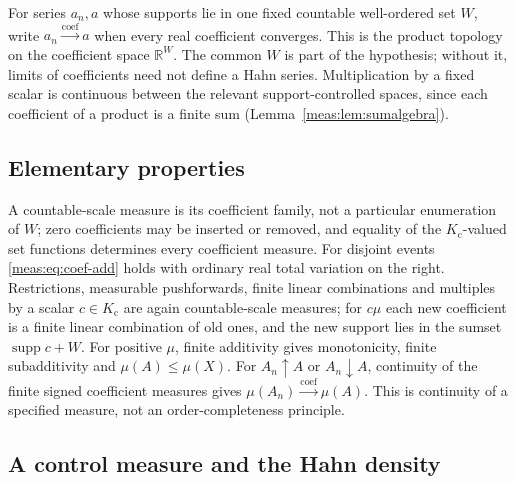 \documentclass[11pt]{article}
\numberwithin{equation}{section}
\theoremstyle{definition}
\theoremstyle{remark}
\newcommand{\R}{\mathbb R}
\newcommand{\supp}{\operatorname{supp}}
\newcommand{\Kc}{K_{\mathrm c}}
\newcommand{\tocoef}{\xrightarrow{\mathrm{coef}}}
\begin{document}
For series $a_n,a$ whose supports lie in one fixed countable well-ordered set
$W$, write $a_n\tocoef a$ when every real coefficient converges. This is the
product topology on the coefficient space $\R^W$. The common $W$ is part of the
hypothesis; without it, limits of coefficients need not define a Hahn series.
Multiplication by a fixed scalar is continuous between the relevant
support-controlled spaces, since each coefficient of a product is a finite sum
(Lemma~\ref{meas:lem:sumalgebra}).

\subsection{Elementary properties}

A countable-scale measure is its coefficient family, not a particular
enumeration of $W$; zero coefficients may be inserted or removed, and equality
of the $\Kc$-valued set functions determines every coefficient measure. For
disjoint events \eqref{meas:eq:coef-add} holds with ordinary real total
variation on the right. Restrictions, measurable pushforwards, finite linear
combinations and multiples by a scalar $c\in\Kc$ are again countable-scale
measures; for $c\mu$ each new coefficient is a finite linear combination of old
ones, and the new support lies in the sumset $\supp c+W$. For positive $\mu$,
finite additivity gives monotonicity, finite subadditivity and
$\mu(A)\le\mu(X)$. For $A_n\uparrow A$ or $A_n\downarrow A$, continuity of the
finite signed coefficient measures gives $\mu(A_n)\tocoef\mu(A)$. This is
continuity of a specified measure, not an order-completeness principle.

\subsection{A control measure and the Hahn density}
\end{document}
